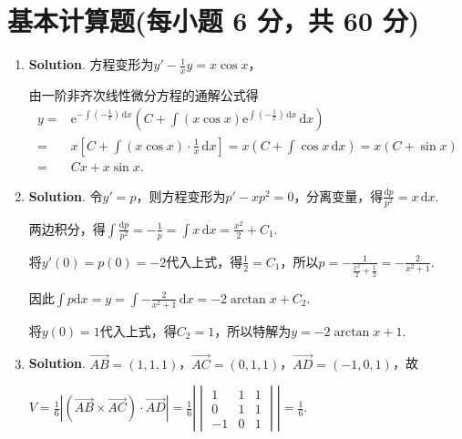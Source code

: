 \documentclass[../Main.tex]{subfiles}
\begin{document}
\section{基本计算题(每小题 6 分，共 60 分)}
\begin{enumerate}
    \item \textbf{Solution}. 方程变形为$y'-\frac{1}{x}y=x\cos x$，

          由一阶非齐次线性微分方程的通解公式得
          \[
              \begin{aligned}
                  y = & \mathrm{e}^{-\int\left(-\frac{1}{x}\right)\,\mathrm{d}x}\left(C+\int\left(x\cos x\right)\mathrm{e}^{\int\left(-\frac{1}{x}\right)\,\mathrm{d}x}\,\mathrm{d}x\right) \\
                  =   & x\left[C+\int\left(x\cos x\right)\cdot\frac{1}{x}\,\mathrm{d}x\right] = x\left(C+\int\cos x\,\mathrm{d}x\right) = x(C+\sin x)                                       \\
                  =   & Cx+x\sin x.
              \end{aligned}
          \]

    \item \textbf{Solution}. 令$y'=p$，则方程变形为$p'-xp^{2}=0$，分离变量，得$\frac{\mathrm{d}p}{p^{2}}
              =x\,\mathrm{d}x$.

          两边积分，得$\int\frac{\mathrm{d}p}{p^{2}}=-\frac{1}{p}=\int x\,\mathrm{d}x=\frac{x^{2}}{2}
              +C_{1}$.

          将$y'(0)=p(0)=-2$代入上式，得$\frac{1}{2}=C_{1}$，所以$p=-\frac{1}{\frac{x^{2}}{2}+\frac{1}{2}}
              =-\frac{2}{x^{2}+1}$.

          因此$\int p \mathrm{d}x =y = \int -\frac{2}{x^{2}+1}\,\mathrm{d}x = -2\arctan
              x + C_{2}$.

          将$y(0)=1$代入上式，得$C_{2}=1$，所以特解为$y=-2\arctan x + 1$.

    \item \textbf{Solution}. $\overrightarrow{AB}= (1,1,1)$，$\overrightarrow{AC}
              = (0,1,1)$，$\overrightarrow{AD}= (-1,0,1)$，故

          $V=\frac{1}{6}\left|\left(\overrightarrow{AB}\times\overrightarrow{AC}\right
              )\cdot \overrightarrow{AD}\right| = \frac{1}{6}\left|
              \begin{vmatrix}
                  1  & 1 & 1 \\
                  0  & 1 & 1 \\
                  -1 & 0 & 1
              \end{vmatrix}\right| = \frac{1}{6}.$


\end{enumerate}
\end{document}
